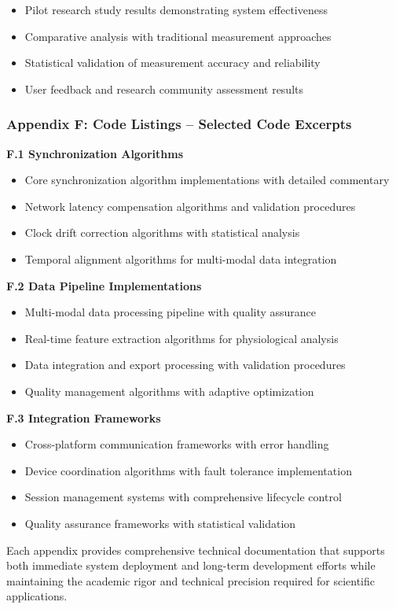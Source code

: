\documentclass[12pt,a4paper]{report}
\begin{document}
\begin{itemize}
\item Pilot research study results demonstrating system effectiveness
\item Comparative analysis with traditional measurement approaches
\item Statistical validation of measurement accuracy and reliability
\item User feedback and research community assessment results

\end{itemize}
\subsubsection{Appendix F: Code Listings – Selected Code Excerpts}

\textbf{F.1 Synchronization Algorithms}

\begin{itemize}
\item Core synchronization algorithm implementations with detailed commentary
\item Network latency compensation algorithms and validation procedures
\item Clock drift correction algorithms with statistical analysis
\item Temporal alignment algorithms for multi-modal data integration

\end{itemize}
\textbf{F.2 Data Pipeline Implementations}

\begin{itemize}
\item Multi-modal data processing pipeline with quality assurance
\item Real-time feature extraction algorithms for physiological analysis
\item Data integration and export processing with validation procedures
\item Quality management algorithms with adaptive optimization

\end{itemize}
\textbf{F.3 Integration Frameworks}

\begin{itemize}
\item Cross-platform communication frameworks with error handling
\item Device coordination algorithms with fault tolerance implementation
\item Session management systems with comprehensive lifecycle control
\item Quality assurance frameworks with statistical validation

\end{itemize}
Each appendix provides comprehensive technical documentation that supports both immediate system deployment and
long-term development efforts while maintaining the academic rigor and technical precision required for scientific
applications.
\end{document}
